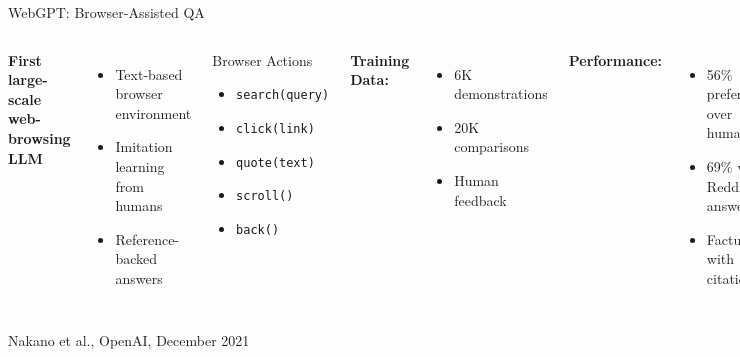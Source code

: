 \documentclass[aspectratio=169]{beamer}
\begin{document}
\begin{frame}{WebGPT: Browser-Assisted QA}
	\begin{columns}
		\textbf{First large-scale web-browsing LLM}
		
		\begin{itemize}
			\item Text-based browser environment
			\item Imitation learning from humans
			\item Reference-backed answers
		\end{itemize}
		
		\begin{block}{Browser Actions}
			\small
			\begin{itemize}
				\item \texttt{search(query)}
				\item \texttt{click(link)}
				\item \texttt{quote(text)}
				\item \texttt{scroll()}
				\item \texttt{back()}
			\end{itemize}
		\end{block}
		
		\textbf{Training Data:}
		\begin{itemize}
			\item 6K demonstrations
			\item 20K comparisons
			\item Human feedback
		\end{itemize}
		
		\textbf{Performance:}
		\begin{itemize}
			\item {\color{highlight}56\%} preferred over humans
			\item {\color{highlight}69\%} vs Reddit answers
			\item Factual with citations
		\end{itemize}
	\end{columns}
	
	\vspace{0.3cm}
	\small
	Nakano et al., OpenAI, December 2021
\end{frame}
\end{document}
